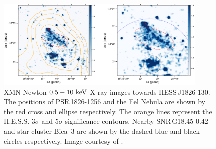 \begin{table}[h!]
    \caption{Fit parameters to the spectrum of \mbox{HESS\,J1826-130}. Power law (PL): $\dv{N}{E}\propto \qty(\frac{E_p}{E_0})^{-\Gamma}$. Exponential Cutoff Power Law (ECPL): $\dv{N}{E}\propto \qty(\frac{E_p}{E_0})^{-\Gamma}\exp(-\frac{E}{E_c})$. Broken Power Law (BPL): $\dv{N}{E}\propto \qty(\frac{E_p}{E_b})^{-\Gamma}$ where $\Gamma=\Gamma_1$ if $E<E_b$ and $\Gamma=\Gamma_2$ otherwise. $E_0=1~\TeV$ unless specified.}
    \label{tab:chapter1_1826_parameters}
\end{table}

\begin{figure}[ht]
    \centering
    \includegraphics[width=0.9\textwidth]{04_Introduction/Images/pulsar_wind_nebula/hess_j1826_130_xray.jpg}
    \caption{XMN-Newton $0.5-10~\si{\kilo\electronvolt}$ X-ray images towards \mbox{HESS\,J1826-130}. The positions of \mbox{PSR\,1826-1256} and the Eel Nebula are shown by the red cross and ellipse respectively. The orange lines represent the H.E.S.S. $3\sigma$ and $5\sigma$ significance contours. Nearby \mbox{SNR\,G18.45-0.42} and star cluster \mbox{Bica 3} are shown by the dashed blue and black circles respectively.  Image courtesy of \cite{2022ApJ...930..148B}.}
    \label{fig:chapter1_hess_j1826_xray}
\end{figure}

